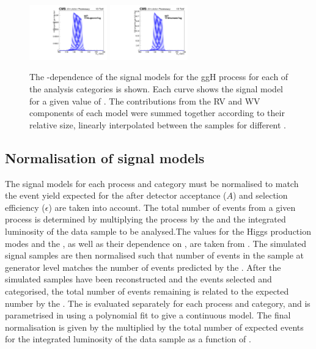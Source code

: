 \begin{figure}[ht!]
\includegraphics[width=0.3\textwidth]{modellingFigures/DCBpG/ggh_TTHLeptonicTag_fmc_interp.pdf} 
\includegraphics[width=0.3\textwidth]{modellingFigures/DCBpG/ggh_TTHHadronicTag_fmc_interp.pdf} 
\caption{The \mH-dependence of the signal models for the ggH process for each of the analysis categories is shown. Each curve shows the signal model for a given value of \mH. The contributions from the RV and WV components of each model were summed together according to their relative size, linearly interpolated between the samples for different \mH.}

\label{fig:model:sig_interpolation}
\end{figure}

\subsection{Normalisation of signal models}

The signal models for each process and category must be normalised to match the event yield expected for the \SM after detector acceptance ($A$) and selection efficiency ($\epsilon$) are taken into account. The total number of events from a given process is determined by multiplying the process \crosssection by the \Hgg \BR and the integrated luminosity of the data sample to be analysed.The values for the Higgs production modes and the \Hgg \BR, as well as their dependence on \mH, are taken from \LHCHXSWG. The simulated signal samples are then normalised such that number of events in the sample at generator level matches the number of events predicted by the \SM. After the simulated samples have been reconstructed and the events selected and categorised, the total number of events remaining is related to the expected number by the \effxacc. The \effxacc is evaluated separately for each process and category, and is parametrised in \mH using a polynomial fit to give a continuous model. The final normalisation is given by the \effxacc multiplied by the total number of expected events for the integrated luminosity of the data sample as a function of \mH.

